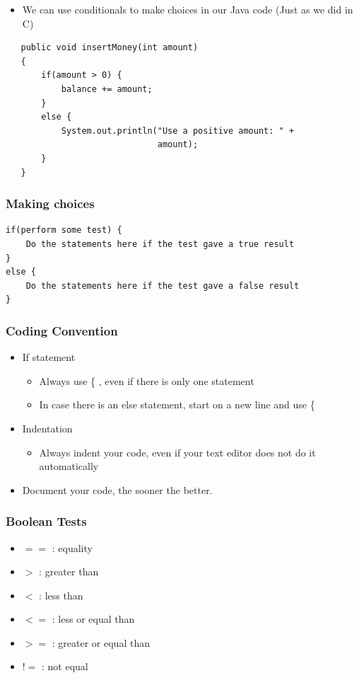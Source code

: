 \documentclass{beamer}
\begin{document}
\begin{frame}[fragile]
\begin{itemize}
\item We can use conditionals to make choices in our Java code (Just as we did in C)
\end{itemize}
\small
\begin{lstlisting}
   public void insertMoney(int amount)‏
   {
       if(amount > 0) {
           balance += amount;
       }
       else {
           System.out.println("Use a positive amount: " +
                              amount);
       }
   }
\end{lstlisting}
\end{frame} 

\begin{frame}[fragile]
\frametitle{Making choices}
\small
\begin{lstlisting}
if(perform some test) {
    Do the statements here if the test gave a true result
}
else {
    Do the statements here if the test gave a false result
} 
\end{lstlisting}
\end{frame}

\begin{frame}
\frametitle{Coding Convention}
\begin{itemize}
\item If statement
\begin{itemize}
\item Always use \{ , even if there is only one statement
\item In case there is an else statement, start on a new line and use \{
\end{itemize}
\item Indentation
\begin{itemize}
\item Always indent your code, even if your text editor does not do it automatically
\end{itemize}
\item Document your code, the sooner the better. 
\end{itemize}
\end{frame}

\begin{frame}[fragile]
\frametitle{Boolean Tests}
\begin{itemize}
\item{$==$} : equality
\item{$>$} : greater than
\item{$<$} : less than
\item{$<=$} : less or equal than
\item{$>=$} : greater or equal than
\item{$!=$} : not equal
\end{itemize}
\end{frame}
\end{document}
